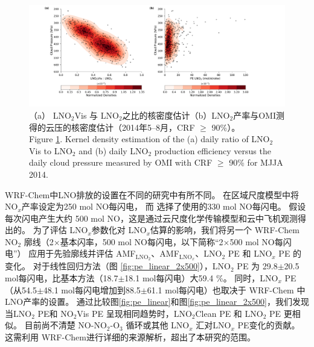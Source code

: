 \begin{figure}[htbp]
\centering
\includegraphics[width=15cm]{./figures/cp_ratio_lno2.pdf}
\caption{（a） LNO$_\textrm{2}$Vis 与 LNO$_\textrm{2}$之比的核密度估计（b）LNO$_\textrm{2}$产率与OMI测得的云压的核密度估计（2014年5--8月，CRF $\geq$ 90\%）。\\
Figure \ref{fig:cp_ratio_lno2}. Kernel density estimation of the (a) daily ratio of LNO$_\textrm{2}$Vis to LNO$_\textrm{2}$ and (b) daily LNO$_\textrm{2}$ production efficiency versus the daily cloud pressure measured by OMI with CRF $\geq$ 90\% for MJJA 2014.}
\label{fig:cp_ratio_lno2}
\end{figure}


WRF-Chem中LNO排放的设置在不同的研究中有所不同。
\citet{Zhao.2009}在区域尺度模型中将NO$_x$产率设定为250 mol NO每闪电，
而 \citet{Bela.2016}选择了\citet{Barth.2012}使用的330 mol NO每闪电。
\citet{Wang.2015a}假设每次闪电产生大约 500 mol NO，这是通过云尺度化学传输模型和云中飞机观测得出的\citep{Ott.2010}。
为了评估 LNO$_x$参数化对 LNO$_x$估算的影响，我们将另一个 WRF-Chem NO$_2$ 廓线（2$\times$基本闪率，500 mol NO每闪电，以下简称“2$\times$500 mol NO每闪电”）
应用于先验廓线并评估 AMF$_\textrm{LNO$_2$}$、AMF$_\textrm{LNO$_x$}$、LNO$_2$ PE 和 LNO$_x$ PE 的变化。
对于线性回归方法（图 \ref{fig:pe_linear_2x500}），LNO$_2$ PE 为 29.8$\pm$20.5 mol每闪电，比基本方法（18.7$\pm$18.1 mol每闪电）大59.4 \%。
同时，LNO$_x$ PE（从54.5$\pm$48.1 mol每闪电增加到88.5$\pm$61.1 mol每闪电）也取决于 WRF-Chem 中 LNO产率的设置。
通过比较图\ref{fig:pe_linear}和图\ref{fig:pe_linear_2x500}，我们发现当LNO$_2$ PE和 NO$_2$Vis PE 呈现相同趋势时，LNO$_2$Clean PE 和 LNO$_2$ PE 更相似。
目前尚不清楚 NO-NO$_2$-O$_3$ 循环或其他 LNO$_x$ 汇对LNO$_x$ PE变化的贡献。
这需利用 WRF-Chem进行详细的来源解析，超出了本研究的范围。

